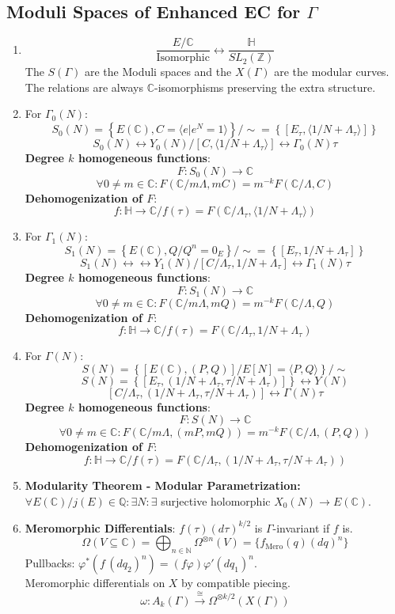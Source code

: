 \documentclass{article}
\newcommand{\Q}{\mathbb{Q}}
\newcommand{\C}{\mathbb{C}}
\newcommand{\Z}{\mathbb{Z}}
\newcommand{\HH}{\mathbb{H}}
\newcommand{\N}{\mathbb{N}}
\newcommand{\ra}{\rightarrow}
\newcommand{\lra}{\leftrightarrow}
\newcommand{\raa}[1]{\overset{#1}{\longrightarrow}}
\begin{document}
\subsection{Moduli Spaces of Enhanced EC for $\Gamma$}
\begin{multicols}{2}
\begin{enumerate}
\item 
\[\frac{E/\C}{\textrm{Isomorphic}} \lra \frac{\HH}{SL_2(\Z)}\]
The $S(\Gamma)$ are the Moduli spaces and the $X(\Gamma)$ are the modular curves. The relations are always $\C$-isomorphisms preserving the extra structure.
\item For $\Gamma_0(N)$:
\[S_0(N) = \left\{E(\C), C = \langle e|e^N = 1\rangle\right\}/\sim = \left\{\left[E_\tau, \langle 1/N + \Lambda_\tau \rangle\right] \right\}\]  
\[S_0(N)  \lra  Y_0(N)/ [C, \langle 1/N+ \Lambda_\tau\rangle]  \lra  \Gamma_0(N)\tau\]
\textbf{Degree $k$ homogeneous functions}:
\[F: S_0(N) \ra \C\] 
\[\forall 0 \neq m \in \C: F(\C/m\Lambda, mC) = m^{-k} F(\C/\Lambda, C)\] 
\textbf{Dehomogenization of $F$}: 
\[f: \HH \ra \C/f(\tau) = F(\C/\Lambda_\tau, \langle 1/N + \Lambda_\tau \rangle)\]

\item For $\Gamma_1(N)$:  
\[S_1(N) = \left\{E(\C),Q/ Q^n = 0_E\right\}/\sim = \left\{[E_\tau, 1/N + \Lambda_\tau ] \right\}\]  
\[S_1(N)  \lra \lra  Y_1(N) /[C/\Lambda_\tau, 1/N+ \Lambda_\tau]  \lra  \Gamma_1(N)\tau\]
\textbf{Degree $k$ homogeneous functions}:
\[F: S_1(N) \ra \C\]
\[\forall 0 \neq m \in \C: F(\C/m\Lambda, mQ) = m^{-k} F(\C/\Lambda, Q)\]
\textbf{Dehomogenization of $F$}: 
\[f: \HH \ra \C/f(\tau) = F(\C/\Lambda_\tau, 1/N + \Lambda_\tau)\]

\item For $\Gamma(N)$:
\[S(N) = \left\{[E(\C),(P,Q)]/ E[N] = \langle P,Q \rangle\right\}/\sim\] 
\[S(N) = \left\{[E_\tau, (1/N + \Lambda_\tau, \tau/N + \Lambda_\tau)] \right\} \lra  Y(N) \]
\[[C/\Lambda_\tau, (1/N+ \Lambda_\tau,\tau/N+ \Lambda_\tau)]  \lra \Gamma(N)\tau\]
\textbf{Degree $k$ homogeneous functions}:
\[F: S(N) \ra \C\]
\[\forall 0 \neq m \in \C: F(\C/m\Lambda, (mP,mQ)) = m^{-k} F(\C/\Lambda, (P,Q))\] 
\textbf{Dehomogenization of $F$}: 
\[f: \HH \ra \C/f(\tau) = F(\C/\Lambda_\tau, (1/N + \Lambda_\tau, \tau/N + \Lambda_\tau))\]


\item \textbf{Modularity Theorem - Modular Parametrization:} $\forall E(\C)/j(E) \in \Q: \exists N: \exists$ surjective holomorphic  $X_0(N) \ra E(\C)$.

\item \textbf{Meromorphic Differentials}: $f(\tau)(d\tau)^{k/2}$ is $\Gamma$-invariant if $f$ is. 
\[\Omega(V \subseteq \C) = \bigoplus_{n \in \N} \Omega^{\otimes n}(V) = \{f_{\textrm{Mero}}(q)(dq)^n\} \]
Pullbacks: $\varphi^*(f\,(dq_2)^n) = (f\varphi) \varphi' (dq_1)^n$. \\
Meromorphic differentials on $X$ by compatible piecing. 
\[\omega: A_k(\Gamma) \raa{\cong} \Omega^{\otimes k/2} (X(\Gamma))\]
\end{enumerate}
\end{multicols}
\end{document}
